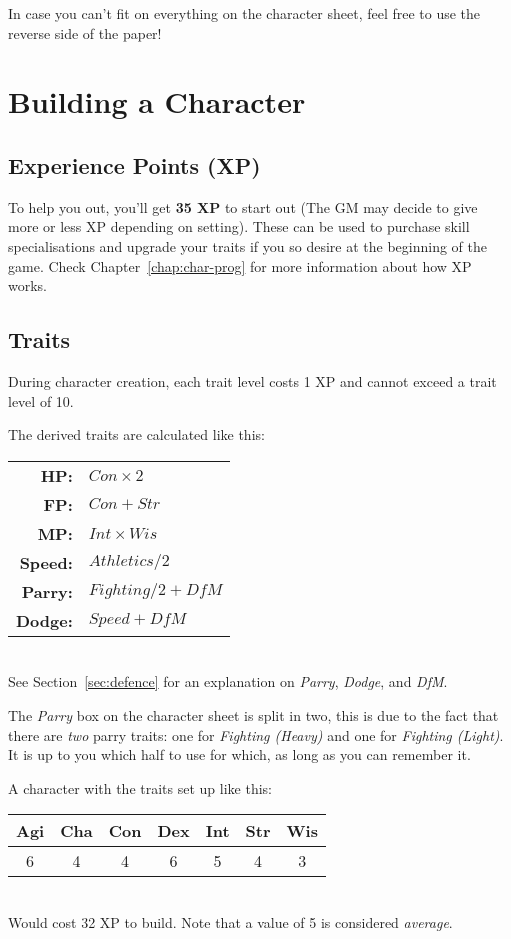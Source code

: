 \note In case you can't fit on everything on the character sheet, feel free to use the reverse side of the paper!

\section{Building a Character}
\subsection{Experience Points (XP)}
To help you out, you'll get \textbf{35 XP} to start out (The GM may decide to give more or less XP depending on setting).
These can be used to purchase skill specialisations and upgrade your traits if you so desire at the beginning of the game.
Check Chapter~\ref{chap:char-prog} for more information about how XP works.

\subsection{Traits}
During character creation, each trait level costs 1 XP and cannot exceed a trait level of 10.

The derived traits are calculated like this:

\begin{tabular} {r | l} 
\textbf{HP:} & $Con \times 2$ \\
\textbf{FP:} & $Con + Str$ \\
\textbf{MP:} & $Int \times Wis$ \\
\textbf{Speed:} & $Athletics / 2$\\
\textbf{Parry:} & $Fighting / 2 + \mathit{DfM}$\\
\textbf{Dodge:} & $Speed + \mathit{DfM}$ \\
\end{tabular}\\
See Section~\ref{sec:defence} for an explanation on \textit{Parry}, \textit{Dodge}, and \textit{DfM}.

\note The \textit{Parry} box on the character sheet is split in two, this is due to the fact that there are \textit{two} parry traits: one for \textit{Fighting (Heavy)} and one for \textit{Fighting (Light)}.
It is up to you which half to use for which, as long as you can remember it.

\example A character with the traits set up like this:

\begin{tabular}{ccccccc}
    \textbf{Agi} & \textbf{Cha} & \textbf{Con} & \textbf{Dex} & \textbf{Int} & \textbf{Str} & \textbf{Wis} \\\hline
    6 & 4 & 4 & 6 & 5 & 4 & 3\\ 
\end{tabular}\\
Would cost 32 XP to build.
Note that a value of 5 is considered \textit{average}.

